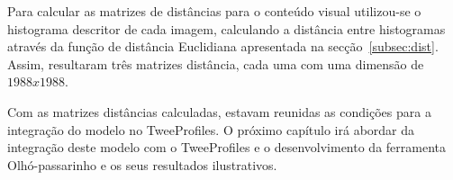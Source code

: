 Para calcular as matrizes de distâncias para o conteúdo visual utilizou-se o histograma descritor de cada imagem, calculando a distância entre histogramas através da função de distância Euclidiana apresentada na secção~\ref{subsec:dist}. Assim, resultaram três matrizes distância, cada uma com uma dimensão de $1988 x 1988$.

Com as matrizes distâncias calculadas, estavam reunidas as condições para a integração do modelo no TweeProfiles. O próximo capítulo irá abordar da integração deste modelo com o TweeProfiles e o desenvolvimento da ferramenta Olhó-passarinho e os seus resultados ilustrativos.